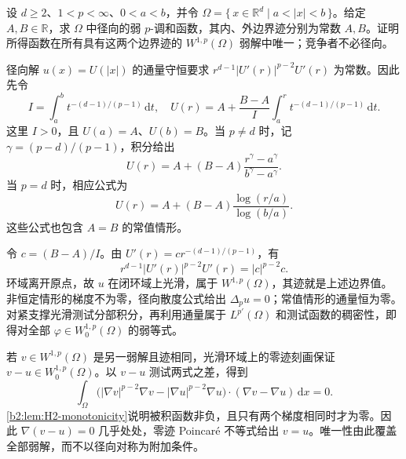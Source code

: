 \begin{exercise}\label{b2:ex:H2-annulus}
设 \(d\ge2\)、\(1<p<\infty\)、\(0<a<b\)，并令
\(\Omega=\{\,x\in\mathbb R^d\mid a<|x|<b\,\}\)。给定 \(A,B\in\mathbb R\)，求 \(\Omega\) 中径向的弱 \(p\)-调和函数，其内、外边界迹分别为常数 \(A,B\)。证明所得函数在所有具有这两个边界迹的 \(W^{1,p}(\Omega)\) 弱解中唯一；竞争者不必径向。
\end{exercise}
\begin{solution}
径向解 \(u(x)=U(|x|)\) 的通量守恒要求
\(r^{d-1}|U'(r)|^{p-2}U'(r)\) 为常数。因此先令
\[
 I=\int_a^b t^{-(d-1)/(p-1)}\,\mathrm dt,
 \quad
 U(r)=A+\frac{B-A}{I}\int_a^r t^{-(d-1)/(p-1)}\,\mathrm dt.
\]
这里 \(I>0\)，且 \(U(a)=A\)、\(U(b)=B\)。当 \(p\ne d\) 时，记 \(\gamma=(p-d)/(p-1)\)，积分给出
\[
 U(r)=A+(B-A)\frac{r^\gamma-a^\gamma}{b^\gamma-a^\gamma}.
\]
当 \(p=d\) 时，相应公式为
\[
 U(r)=A+(B-A)\frac{\log(r/a)}{\log(b/a)}.
\]
这些公式也包含 \(A=B\) 的常值情形。

令 \(c=(B-A)/I\)。由 \(U'(r)=cr^{-(d-1)/(p-1)}\)，有
\[
 r^{d-1}|U'(r)|^{p-2}U'(r)=|c|^{p-2}c.
\]
环域离开原点，故 \(u\) 在闭环域上光滑，属于 \(W^{1,p}(\Omega)\)，其迹就是上述边界值。非恒定情形的梯度不为零，径向散度公式给出 \(\Delta_pu=0\)；常值情形的通量恒为零。对紧支撑光滑测试分部积分，再利用通量属于 \(L^{p'}(\Omega)\) 和测试函数的稠密性，即得对全部 \(\varphi\in W_0^{1,p}(\Omega)\) 的弱等式。

若 \(v\in W^{1,p}(\Omega)\) 是另一弱解且迹相同，光滑环域上的零迹刻画保证 \(v-u\in W_0^{1,p}(\Omega)\)。以 \(v-u\) 测试两式之差，得到
\[
 \int_\Omega
 \bigl(|\nabla v|^{p-2}\nabla v-|\nabla u|^{p-2}\nabla u\bigr)
 \cdot(\nabla v-\nabla u)\,\mathrm dx=0.
\]
\cref{b2:lem:H2-monotonicity}说明被积函数非负，且只有两个梯度相同时才为零。因此 \(\nabla(v-u)=0\) 几乎处处，零迹 Poincaré 不等式给出 \(v=u\)。唯一性由此覆盖全部弱解，而不以径向对称为附加条件。
\end{solution}

